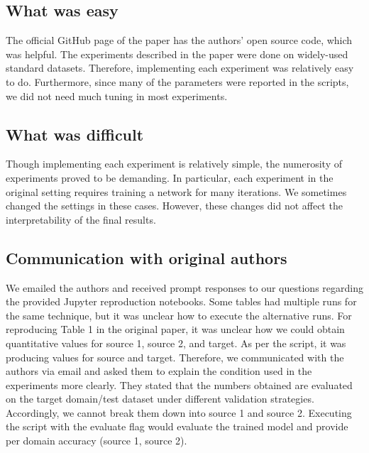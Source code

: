 \subsection{What was easy}
The official GitHub page of the paper has the authors’ open source code, which was helpful. The experiments described in the paper were done on widely-used standard datasets. Therefore, implementing each experiment was relatively easy to do. Furthermore, since many of the parameters were reported in the scripts, we did not need much tuning in most experiments.

\subsection{What was difficult}
Though implementing each experiment is relatively simple, the numerosity of experiments proved to be demanding. In particular, each experiment in the original setting requires training a network for many iterations. We sometimes changed the settings in these cases. However, these changes did not affect the interpretability of the final results.

\subsection{Communication with original authors}
We emailed the authors and received prompt responses to our questions regarding the provided Jupyter reproduction notebooks. Some tables had multiple runs for the same technique, but it was unclear how to execute the alternative runs. For reproducing Table 1 in the original paper, it was unclear how we could obtain quantitative values for source 1, source 2, and target. As per the script, it was producing values for source and target. Therefore, we communicated with the authors via email and asked them to explain the condition used in the experiments more clearly. They stated that the numbers obtained are evaluated on the target domain/test dataset under different validation strategies. Accordingly, we cannot break them down into source 1 and source 2. Executing the script with the evaluate flag would evaluate the trained model and provide per domain accuracy (source 1, source 2). 



